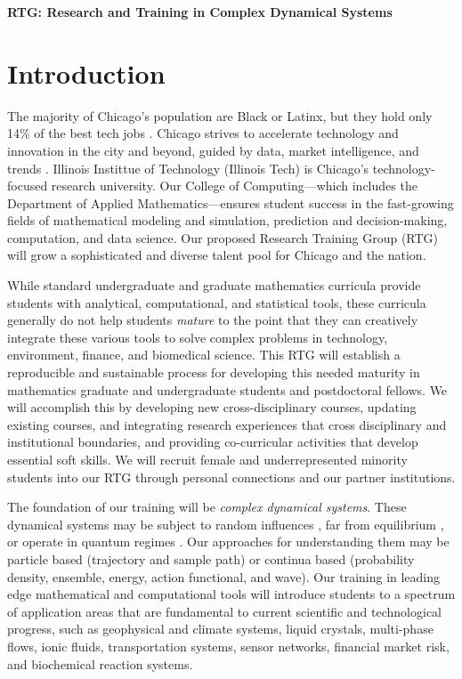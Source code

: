 \documentclass[11pt]{NSFamsart}
\begin{document}
  

\centerline{\large \textbf{RTG: Research and Training in Complex Dynamical Systems}}

\section{Introduction}

The majority of Chicago's population are Black or Latinx, but they hold only 14\% of the best tech jobs \cite{P33}. 
Chicago strives to accelerate  technology and innovation in the city and beyond, guided by data, market intelligence, and trends \cite{Chicago}. Illinois Instittue of Technology (Illinois Tech) is Chicago's technology-focused research university.  Our College of Computing---which includes the Department of Applied Mathematics---ensures student success in the fast-growing fields of mathematical modeling and simulation, prediction and decision-making, computation, and data science. Our proposed Research Training Group (RTG) will grow a sophisticated and diverse talent pool for Chicago and the nation.

While standard undergraduate and graduate mathematics curricula provide students with  analytical, computational, and statistical tools, these curricula generally do not help students \emph{mature} to the point that they can creatively integrate these various  tools to solve complex problems in technology, environment, finance, and biomedical science. This RTG will establish a reproducible and sustainable process for developing this needed maturity in mathematics graduate and undergraduate students and postdoctoral fellows. We will accomplish this by developing new cross-disciplinary courses, updating existing courses, and integrating research experiences that cross disciplinary and institutional boundaries, and providing co-curricular activities that develop essential soft skills.  We will recruit female and underrepresented minority students into our RTG through personal connections and our partner institutions.

The foundation of our training will be \emph{complex dynamical systems}.  These dynamical systems may be subject to random influences \cite{Arnold, DuanBook2015}, far from equilibrium \cite{liu2009introduction}, or operate in quantum regimes \cite{Dittrich2016}. Our approaches for understanding them may be particle based (trajectory and sample path)  or continua based (probability density, ensemble, energy, action functional, and wave).  Our training in leading edge mathematical and computational tools will introduce students to a spectrum of application areas that are fundamental to current scientific and technological progress, such as geophysical and climate systems, liquid crystals, multi-phase flows, ionic fluids,  transportation systems, sensor networks, financial market risk, and biochemical reaction systems.
\end{document}

